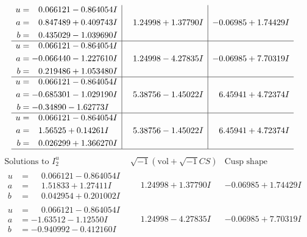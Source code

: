 \documentclass[1p]{elsarticle_modified}
\theoremstyle{definition}
\newcommand{\I}{\sqrt{-1}}
\begin{document}
$$\begin{array}{c|c|c}
\begin{aligned}
u &= \phantom{-}0.066121 - 0.864054 I \\
a &= \phantom{-}0.847489 + 0.409743 I \\
b &= \phantom{-}0.435029 - 1.039690 I\end{aligned}
 & \phantom{-}1.24998 + 1.37790 I & -0.06985 + 1.74429 I \\ \hline\begin{aligned}
u &= \phantom{-}0.066121 - 0.864054 I \\
a &= -0.066440 - 1.227610 I \\
b &= \phantom{-}0.219486 + 1.053480 I\end{aligned}
 & \phantom{-}1.24998 - 4.27835 I & -0.06985 + 7.70319 I \\ \hline\begin{aligned}
u &= \phantom{-}0.066121 - 0.864054 I \\
a &= -0.685301 - 1.029190 I \\
b &= -0.34890 - 1.62773 I\end{aligned}
 & \phantom{-}5.38756 - 1.45022 I & \phantom{-}6.45941 + 4.72374 I \\ \hline\begin{aligned}
u &= \phantom{-}0.066121 - 0.864054 I \\
a &= \phantom{-}1.56525 + 0.14261 I \\
b &= \phantom{-}0.026299 + 1.366270 I\end{aligned}
 & \phantom{-}5.38756 - 1.45022 I & \phantom{-}6.45941 + 4.72374 I\\
 \hline 
 \end{array}$$\newpage$$\begin{array}{c|c|c}  
\text{Solutions to }I^u_{2}& \I (\text{vol} + \sqrt{-1}CS) & \text{Cusp shape}\\
 \hline 
\begin{aligned}
u &= \phantom{-}0.066121 - 0.864054 I \\
a &= \phantom{-}1.51833 + 1.27411 I \\
b &= \phantom{-}0.042954 + 0.201002 I\end{aligned}
 & \phantom{-}1.24998 + 1.37790 I & -0.06985 + 1.74429 I \\ \hline\begin{aligned}
u &= \phantom{-}0.066121 - 0.864054 I \\
a &= -1.63512 - 1.12550 I \\
b &= -0.940992 - 0.412160 I\end{aligned}
 & \phantom{-}1.24998 - 4.27835 I & -0.06985 + 7.70319 I \\ \hline\begin{aligned}

\end{aligned}
\end{array}$$
\end{document}
